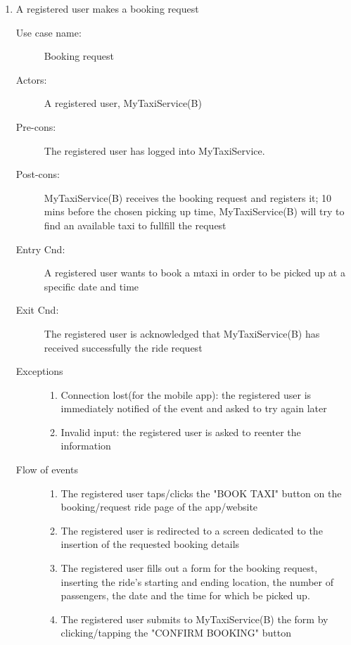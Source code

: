 \documentclass[11pt,titlepage]{article} %
\begin{document}
\begin{enumerate}
	
	      \item A registered user makes a booking request
		\begin{description}
		         \item [Use case name:] Booking request
		         \item [Actors:] A registered user, MyTaxiService(B)
		         \item [Pre-cons:] The registered user has logged into MyTaxiService.
		         \item [Post-cons:] MyTaxiService(B) receives the booking request and registers it; 10 mins before
		         the chosen picking up time, MyTaxiService(B) will try to find an available taxi to fullfill the request
		         \item [Entry Cnd:] A registered user wants to book a mtaxi in order to be picked up at a specific date and time
		         \item [Exit Cnd:] The registered user is acknowledged that MyTaxiService(B) has received successfully the ride
		         request
		         \item [Exceptions]\hfill
			\begin{enumerate}
			           \item Connection lost(for the mobile app): the registered user is immediately notified of the event and
			           asked to try again later
				\item Invalid input: the registered user is asked to reenter the information
			\end{enumerate}
		         \item [Flow of events]\hfill
			\begin{enumerate}
			           \item The registered user taps/clicks the "BOOK TAXI" button on the booking/request ride page of the app/website
			           \item The registered user is redirected to a screen dedicated to the insertion
			           of the requested booking details
			           \item The registered user fills out a form for the booking request, inserting the ride's starting and ending location,
			           the number of passengers, the date and the time for which be picked up.
			           \item The registered user submits to MyTaxiService(B) the form by clicking/tapping the "CONFIRM BOOKING" button
			\end{enumerate}
		\end{description}

\end{enumerate}
\end{document}
